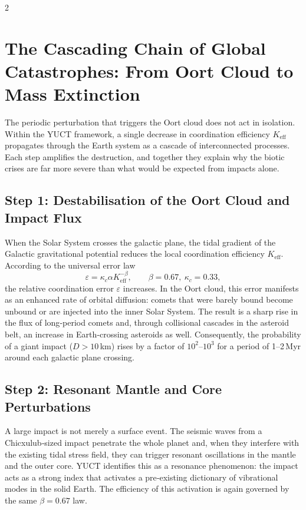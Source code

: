 \documentclass[11pt,a4paper]{article}
\begin{document}
	\begin{multicols}{2}
		
		\section{The Cascading Chain of Global Catastrophes: From Oort Cloud to Mass Extinction}
		
		The periodic perturbation that triggers the Oort cloud does not act in isolation. 
		Within the YUCT framework, a single decrease in coordination efficiency \(K_{\mathrm{eff}}\) 
		propagates through the Earth system as a cascade of interconnected processes. 
		Each step amplifies the destruction, and together they explain why the biotic 
		crises are far more severe than what would be expected from impacts alone.
		
		\subsection{Step 1: Destabilisation of the Oort Cloud and Impact Flux}
		
		When the Solar System crosses the galactic plane, the tidal gradient of the 
		Galactic gravitational potential reduces the local coordination efficiency 
		\(K_{\mathrm{eff}}\). According to the universal error law
		\begin{equation}
			\varepsilon = \kappa_c \alpha K_{\mathrm{eff}}^{-\beta},\qquad \beta=0.67,\ \kappa_c=0.33,
		\end{equation}
		the relative coordination error \(\varepsilon\) increases. In the Oort cloud, 
		this error manifests as an enhanced rate of orbital diffusion: comets that 
		were barely bound become unbound or are injected into the inner Solar System. 
		The result is a sharp rise in the flux of long‑period comets and, through 
		collisional cascades in the asteroid belt, an increase in Earth‑crossing 
		asteroids as well. Consequently, the probability of a giant impact 
		(\(D>10\) km) rises by a factor of \(10^2\)–\(10^3\) for a period of 
		1–2 Myr around each galactic plane crossing.
		
		\subsection{Step 2: Resonant Mantle and Core Perturbations}
		
		A large impact is not merely a surface event. The seismic waves from a 
		Chicxulub‑sized impact penetrate the whole planet and, when they 
		interfere with the existing tidal stress field, they can trigger 
		resonant oscillations in the mantle and the outer core. YUCT identifies 
		this as a resonance phenomenon: the impact acts as a strong index that 
		activates a pre‑existing dictionary of vibrational modes in the solid 
		Earth. The efficiency of this activation is again governed by the same 
		\(\beta = 0.67\) law.
		

\end{multicols}
\end{document}
